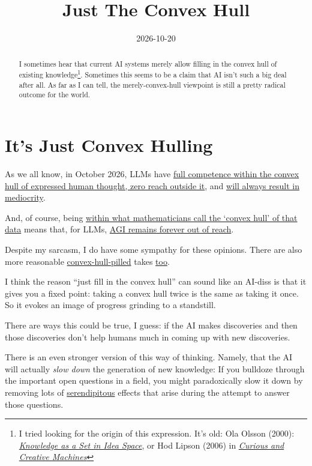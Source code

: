 \documentclass[11pt]{article}
\title{Just The Convex Hull}
\date{2026-10-20}
\begin{document}
\begin{abstract}
	I sometimes hear that current AI systems merely allow filling in the convex hull of existing knowledge\footnote{I tried looking for the origin of this expression. It's old: Ola Olsson (2000): \href{https://link.springer.com/article/10.1023/A:1009829601155}{\textit{Knowledge as a Set in Idea Space}}, or Hod Lipson (2006) in \href{https://link.springer.com/chapter/10.1007/978-3-540-77296-5_28}{\textit{Curious and Creative Machines}}}.
Sometimes this seems to be a claim that AI isn't such a big deal after all.
As far as I can tell, the merely-convex-hull viewpoint is still a pretty radical outcome for the world.
\end{abstract}

\section{It's Just Convex Hulling}

As we all know, in October 2026, LLMs have \href{https://albertsikkema.com/ai/opinion/research/2026/06/24/why-llms-will-not-have-your-next-big-idea.html}{full competence within the convex hull of expressed human thought, zero reach outside it}, and \href{https://albertsikkema.com/ai/opinion/research/2026/06/24/why-llms-will-not-have-your-next-big-idea.html}{will always result in mediocrity}.

And, of course, being \href{https://medium.com/@soltrinox/the-llm-dead-end-19e7ae349e28}{within what mathematicians call the `convex hull' of that data} means that, for LLMs,
\href{https://medium.com/@soltrinox/the-llm-dead-end-19e7ae349e28}{AGI remains forever out of reach}.

Despite my sarcasm, I do have some sympathy for these opinions. There are also more reasonable \href{https://birdsnfrogs.github.io/2026/09/12/Felix_qui_potuit_rerum_cognoscere_causas.html}{convex-hull-pilled} takes
\href{https://terrytao.wordpress.com/2026/10/08/what-should-we-tell-our-students/}{too}.

I think the reason ``just fill in the convex hull'' can sound like an AI-diss is that it gives you a fixed point: taking a convex hull twice is the same as taking it once.
So it evokes an image of progress grinding to a standstill.

There are ways this could be true, I guess: if the AI makes discoveries and then those discoveries don't help humans much in coming up with new discoveries.

There is an even stronger version of this way of thinking.
Namely, that the AI will actually \textit{slow down} the generation of new knowledge: If you bulldoze through the important open questions in a field, you might paradoxically slow it down by removing lots of
\href{https://newsroom.ucla.edu/magazine/terence-tao-math-artificial-intelligence-alpha-research}{serendipitous} effects that arise during the attempt to answer those questions.
\end{document}
